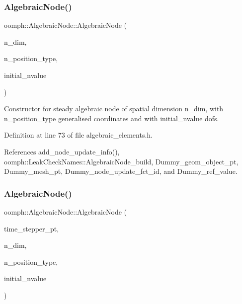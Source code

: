 \subsubsection{\texorpdfstring{Algebraic\+Node()}{AlgebraicNode()}\hspace{0.1cm}{\footnotesize\ttfamily [2/4]}}
{\footnotesize\ttfamily oomph\+::\+Algebraic\+Node\+::\+Algebraic\+Node (\begin{DoxyParamCaption}\item[{const unsigned \&}]{n\+\_\+dim,  }\item[{const unsigned \&}]{n\+\_\+position\+\_\+type,  }\item[{const unsigned \&}]{initial\+\_\+nvalue }\end{DoxyParamCaption})\hspace{0.3cm}{\ttfamily [inline]}}



Constructor for steady algebraic node of spatial dimension n\+\_\+dim, with n\+\_\+position\+\_\+type generalised coordinates and with initial\+\_\+nvalue dofs. 



Definition at line 73 of file algebraic\+\_\+elements.\+h.



References add\+\_\+node\+\_\+update\+\_\+info(), oomph\+::\+Leak\+Check\+Names\+::\+Algebraic\+Node\+\_\+build, Dummy\+\_\+geom\+\_\+object\+\_\+pt, Dummy\+\_\+mesh\+\_\+pt, Dummy\+\_\+node\+\_\+update\+\_\+fct\+\_\+id, and Dummy\+\_\+ref\+\_\+value.

\mbox{\label{classoomph_1_1AlgebraicNode_ab97ffb4a9663ce90e4d7788315ba31a1}} 
\subsubsection{\texorpdfstring{Algebraic\+Node()}{AlgebraicNode()}\hspace{0.1cm}{\footnotesize\ttfamily [3/4]}}
{\footnotesize\ttfamily oomph\+::\+Algebraic\+Node\+::\+Algebraic\+Node (\begin{DoxyParamCaption}\item[{\hyperlink{classoomph_1_1TimeStepper}{Time\+Stepper} $\ast$}]{time\+\_\+stepper\+\_\+pt,  }\item[{const unsigned \&}]{n\+\_\+dim,  }\item[{const unsigned \&}]{n\+\_\+position\+\_\+type,  }\item[{const unsigned \&}]{initial\+\_\+nvalue }\end{DoxyParamCaption})\hspace{0.3cm}{\ttfamily [inline]}}



